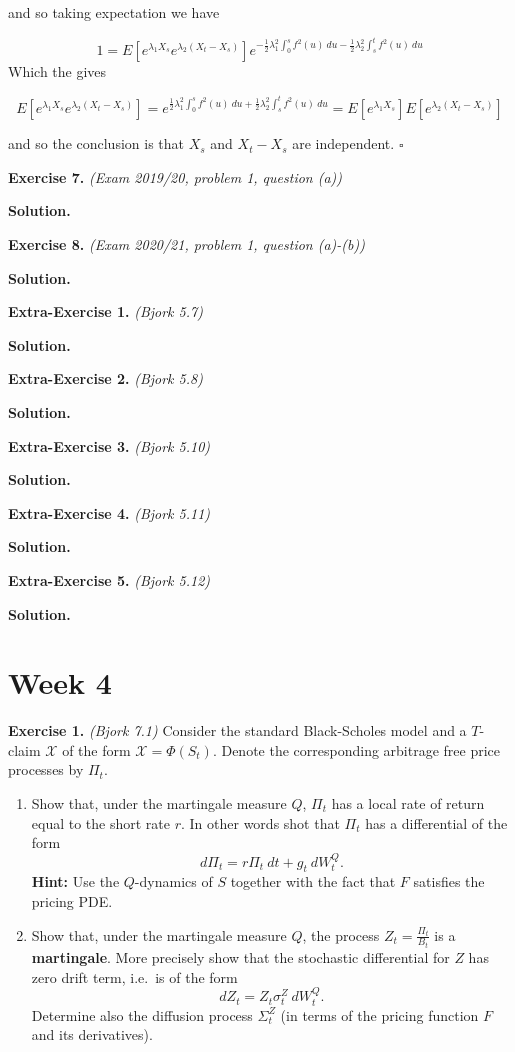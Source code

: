 \documentclass[
]{book}
\providecommand{\tightlist}{%
  \setlength{\itemsep}{0pt}\setlength{\parskip}{0pt}}
\begin{document}
and so taking expectation we have

\[
1=E[e^{\lambda_1X_s}e^{\lambda_2(X_t-X_s)}]e^{-\frac{1}{2}\lambda_1^2\int_0^s f^2(u)\ du-\frac{1}{2}\lambda_2^2\int_s^t f^2(u)\ du}
\]
Which the gives

\[
E[e^{\lambda_1X_s}e^{\lambda_2(X_t-X_s)}]=e^{\frac{1}{2}\lambda_1^2\int_0^s f^2(u)\ du+\frac{1}{2}\lambda_2^2\int_s^t f^2(u)\ du}=E[e^{\lambda_1X_s}]E[e^{\lambda_2(X_t-X_s)}]
\]

and so the conclusion is that \(X_s\) and \(X_t-X_s\) are independent. \(\square\)

\textbf{Exercise 7.} \emph{(Exam 2019/20, problem 1, question (a))}

\textbf{Solution.}

\textbf{Exercise 8.} \emph{(Exam 2020/21, problem 1, question (a)-(b))}

\textbf{Solution.}

\textbf{Extra-Exercise 1.} \emph{(Bjork 5.7)}

\textbf{Solution.}

\textbf{Extra-Exercise 2.} \emph{(Bjork 5.8)}

\textbf{Solution.}

\textbf{Extra-Exercise 3.} \emph{(Bjork 5.10)}

\textbf{Solution.}

\textbf{Extra-Exercise 4.} \emph{(Bjork 5.11)}

\textbf{Solution.}

\textbf{Extra-Exercise 5.} \emph{(Bjork 5.12)}

\textbf{Solution.}

\hypertarget{week-4}{%
\section{Week 4}\label{week-4}}

\textbf{Exercise 1.} \emph{(Bjork 7.1)} Consider the standard Black-Scholes model and a \(T\)-claim \(\mathcal{X}\) of the form \(\mathcal{X}=\Phi(S_t)\). Denote the corresponding arbitrage free price processes by \(\Pi_t\).

\begin{enumerate}
\def\labelenumi{\alph{enumi}.}
\tightlist
\item
  Show that, under the martingale measure \(Q\), \(\Pi_t\) has a local rate of return equal to the short rate \(r\). In other words shot that \(\Pi_t\) has a differential of the form
  \[
    d\Pi_t=r\Pi_t\ dt+g_t\ dW_t^Q.
    \]
  \textbf{Hint:} Use the \(Q\)-dynamics of \(S\) together with the fact that \(F\) satisfies the pricing PDE.
\item
  Show that, under the martingale measure \(Q\), the process \(Z_t=\frac{\Pi_t}{B_t}\) is a \textbf{martingale}. More precisely show that the stochastic differential for \(Z\) has zero drift term, i.e.~is of the form
  \[
    dZ_t=Z_t\sigma_t^Z\ dW_t^Q.
    \]
  Determine also the diffusion process \(\Sigma_t^Z\) (in terms of the pricing function \(F\) and its derivatives).
\end{enumerate}
\end{document}
